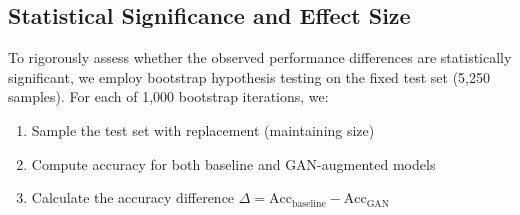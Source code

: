 \documentclass[10pt, twocolumn, letterpaper]{article}
\begin{document}
\begin{table}[h]
\centering
\caption{Classification Performance Comparison. Results demonstrate that strategic resampling alone achieves strong performance, while GAN augmentation with limited training data (40 images) causes performance degradation.}
\label{tab:results}
\vspace{0.2cm}
\end{table}

\subsection{Statistical Significance and Effect Size}

To rigorously assess whether the observed performance differences are statistically significant, we employ bootstrap hypothesis testing on the fixed test set (5,250 samples). For each of 1,000 bootstrap iterations, we:
\begin{enumerate}[leftmargin=*, itemsep=1pt]
    \item Sample the test set with replacement (maintaining size)
    \item Compute accuracy for both baseline and GAN-augmented models
    \item Calculate the accuracy difference $\Delta = \text{Acc}_{\text{baseline}} - \text{Acc}_{\text{GAN}}$
\end{enumerate}
\end{document}
